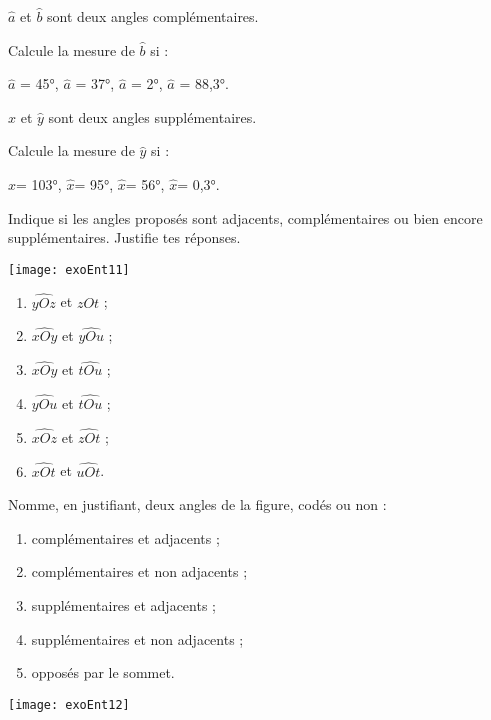 





\begin{exercice}
$\hat{a}$ et $\hat{b}$ sont deux angles complémentaires.

Calcule la mesure de $\hat{b}$ si :

$\hat{a}$ = 45°,\hfill%
$\hat{a}$ = 37°,\hfill%
$\hat{a}$ = 2°,\hfill%
$\hat{a}$ = 88,3°.  
\end{exercice}



\begin{exercice}
$\hat{x}$ et $\hat{y}$ sont deux angles supplémentaires.

Calcule la mesure de $\hat{y}$ si :

$\hat{x}$= 103°,\hfill%
$\hat{x}$= 95°,\hfill%
$\hat{x}$= 56°,\hfill%
$\hat{x}$= 0,3°.
\end{exercice}




\begin{exercice}
Indique si les angles proposés sont adjacents, complémentaires ou bien encore supplémentaires. Justifie tes réponses. 

\begin{center}
    \texttt{[image: exoEnt11]}
\end{center}

\begin{enumerate}
\item $\widehat{yOz}$ et $\widehat{zOt}$ ;
\item $\widehat{xOy}$ et $\widehat{yOu}$ ;
\item $\widehat{xOy}$ et $\widehat{tOu}$ ;
\item $\widehat{yOu}$ et $\widehat{tOu}$ ;
\item $\widehat{xOz}$ et $\widehat{zOt}$ ;
\item $\widehat{xOt}$ et $\widehat{uOt}$.
\end{enumerate}
\end{exercice}



\begin{exercice}
Nomme, en justifiant, deux angles de la figure, codés ou non :
\begin{enumerate}
\item complémentaires et adjacents ;
\item complémentaires et non adjacents ;
\item supplémentaires et adjacents ;
\item supplémentaires et non adjacents ;
\item opposés par le sommet.
\end{enumerate}

\begin{center}
    \texttt{[image: exoEnt12]}
\end{center}

\end{exercice}




